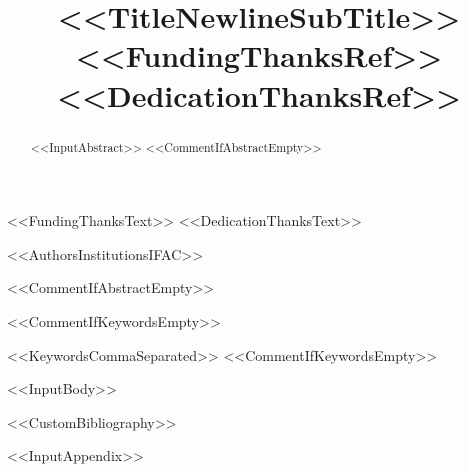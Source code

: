\documentclass[<<DocumentClassOptions>>]{ifacconf}
\begin{document}
\begin{frontmatter}

\title{<<TitleNewlineSubTitle>><<FundingThanksRef>><<DedicationThanksRef>>}
<<FundingThanksText>>
<<DedicationThanksText>>

<<AuthorsInstitutionsIFAC>>

<<CommentIfAbstractEmpty>>\begin{abstract}
<<InputAbstract>>
<<CommentIfAbstractEmpty>>\end{abstract}

<<CommentIfKeywordsEmpty>>\begin{keyword}
<<KeywordsCommaSeparated>>
<<CommentIfKeywordsEmpty>>\end{keyword}

\end{frontmatter}

<<InputBody>>

<<CustomBibliography>>

\appendix
<<InputAppendix>>
\end{document}
